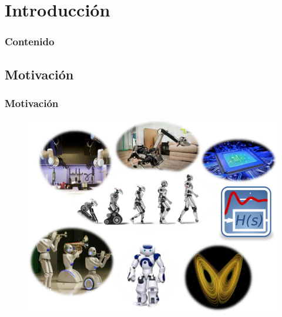 \section{Introducción}
\begin{frame}
	\frametitle{Contenido}
\end{frame}

\subsection{Motivación}
\begin{frame}
	\frametitle{Motivación}
	\begin{figure}
		\begin{center}
			\includegraphics[scale=1]{Introduccion/motivacion.jpg}  
		\end{center}
	\end{figure}
\end{frame}

